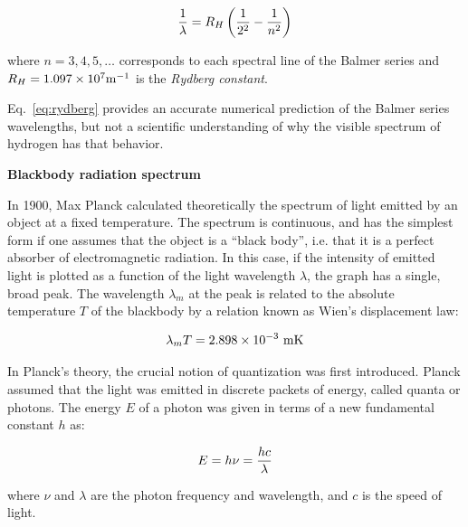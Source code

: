 \begin{equation}
{1 \over \lambda} = R_H \left( {1 \over 2^2} - {1 \over n^2} \right)
\label{eq:rydberg}
\end{equation}

\noindent where $n = 3, 4, 5,\ldots$ corresponds to each spectral line of the
Balmer series and $R_H = 1.097 \times 10^7 {\rm m}^{-1}$ is the \textit{Rydberg
  constant}.

Eq.~\ref{eq:rydberg} provides an accurate numerical prediction of the Balmer
series wavelengths, but not a scientific understanding of why the visible
spectrum of hydrogen has that behavior.
\medskip

\noindent\textbf{Blackbody radiation spectrum}
\medskip

In 1900, Max Planck calculated theoretically the spectrum of light emitted by an
object at a fixed temperature. The spectrum is continuous, and has the simplest
form if one assumes that the object is a ``black body'', i.e. that it is a
perfect absorber of electromagnetic radiation. In this case, if the intensity of
emitted light is plotted as a function of the light wavelength ${\lambda}$, the
graph has a single, broad peak. The wavelength ${\lambda}_m$ at the peak is
related to the absolute temperature $T$ of the blackbody by a relation known as
Wien's displacement law:

\begin{equation}
\lambda_m T = 2.898 \times 10^{-3}~{\rm m} {\rm K}
\label{eq:wein}
\end{equation}

In Planck's theory, the crucial notion of quantization was first
introduced. Planck assumed that the light was emitted in discrete packets of
energy, called quanta or photons. The energy $E$ of a photon was given in terms
of a new fundamental constant $h$ as:

\begin{equation}
 E = h\nu = {hc \over \lambda}
\label{eq:plank}
\end{equation}

\noindent where $\nu$ and $\lambda$ are the photon frequency and wavelength, and
$c$ is the speed of light.

